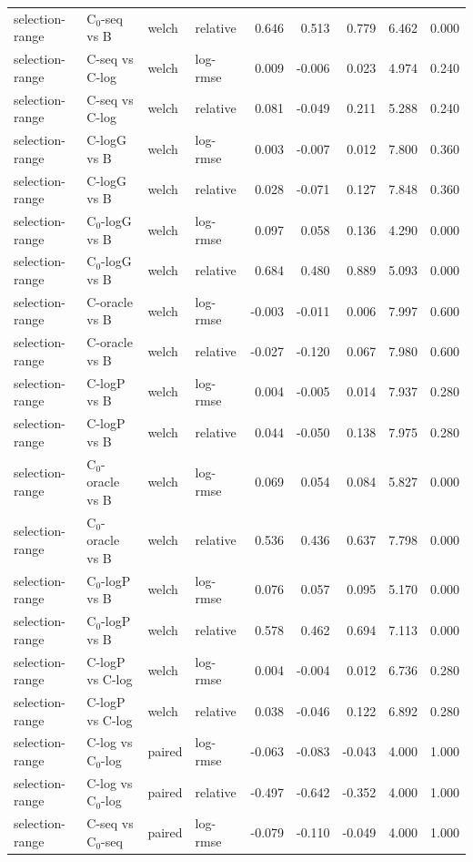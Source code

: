 \begin{longtable}{llllrrrrr}
selection-range & C$_0$-seq vs B & welch & relative & 0.646 & 0.513 & 0.779 & 6.462 & 0.000 \\
selection-range & C-seq vs C-log & welch & log-rmse & 0.009 & -0.006 & 0.023 & 4.974 & 0.240 \\
selection-range & C-seq vs C-log & welch & relative & 0.081 & -0.049 & 0.211 & 5.288 & 0.240 \\
selection-range & C-logG vs B & welch & log-rmse & 0.003 & -0.007 & 0.012 & 7.800 & 0.360 \\
selection-range & C-logG vs B & welch & relative & 0.028 & -0.071 & 0.127 & 7.848 & 0.360 \\
selection-range & C$_0$-logG vs B & welch & log-rmse & 0.097 & 0.058 & 0.136 & 4.290 & 0.000 \\
selection-range & C$_0$-logG vs B & welch & relative & 0.684 & 0.480 & 0.889 & 5.093 & 0.000 \\
selection-range & C-oracle vs B & welch & log-rmse & -0.003 & -0.011 & 0.006 & 7.997 & 0.600 \\
selection-range & C-oracle vs B & welch & relative & -0.027 & -0.120 & 0.067 & 7.980 & 0.600 \\
selection-range & C-logP vs B & welch & log-rmse & 0.004 & -0.005 & 0.014 & 7.937 & 0.280 \\
selection-range & C-logP vs B & welch & relative & 0.044 & -0.050 & 0.138 & 7.975 & 0.280 \\
selection-range & C$_0$-oracle vs B & welch & log-rmse & 0.069 & 0.054 & 0.084 & 5.827 & 0.000 \\
selection-range & C$_0$-oracle vs B & welch & relative & 0.536 & 0.436 & 0.637 & 7.798 & 0.000 \\
selection-range & C$_0$-logP vs B & welch & log-rmse & 0.076 & 0.057 & 0.095 & 5.170 & 0.000 \\
selection-range & C$_0$-logP vs B & welch & relative & 0.578 & 0.462 & 0.694 & 7.113 & 0.000 \\
selection-range & C-logP vs C-log & welch & log-rmse & 0.004 & -0.004 & 0.012 & 6.736 & 0.280 \\
selection-range & C-logP vs C-log & welch & relative & 0.038 & -0.046 & 0.122 & 6.892 & 0.280 \\
selection-range & C-log vs C$_0$-log & paired & log-rmse & -0.063 & -0.083 & -0.043 & 4.000 & 1.000 \\
selection-range & C-log vs C$_0$-log & paired & relative & -0.497 & -0.642 & -0.352 & 4.000 & 1.000 \\
selection-range & C-seq vs C$_0$-seq & paired & log-rmse & -0.079 & -0.110 & -0.049 & 4.000 & 1.000 \\

\end{longtable}
